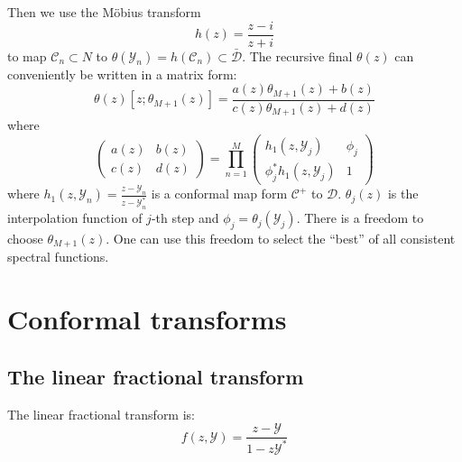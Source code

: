 \documentclass[
	preprint,%
	aps,
	prb,
	showpacs,	
	amsmath, amssymb]{revtex4-2}
\DeclareRobustCommand{\+}{\hstretch{1.25} {\boldsymbol {\mathrel{+}}}}
\newcommand{\Y}{ {\mathcal{Y}} }
\newcommand{\C}{ {\mathcal{C}} }
\newcommand{\D}{ {\mathcal{D}} }
\newcommand{\Dbar}{ {\bar{\mathcal{D}}} }
\begin{document}
Then we use the Möbius transform
\begin{equation}\label{eq:Mobius-transform}
	h(z) = \frac{z - i}{z + i}
\end{equation}
to map $\C_n \subset N$ to 
$\theta(\Y_n) = h(\C_n) \subset \Dbar$. 
The recursive final $\theta(z)$ can conveniently be written in a
matrix form:
\begin{equation}\label{eq:recursive-theta}
	\theta(z)[z;\theta_{M+1}(z)] 
		= \frac{a(z)\theta_{M+1}(z) + b(z)}{c(z)\theta_{M+1}(z) + d(z)}
\end{equation}
where
\begin{equation}\label{eq:factor-matrix}
	\left(
		\begin{matrix}
			a(z) & b(z) \\
			c(z) & d(z)
		\end{matrix}
	\right) = \prod_{n=1}^M
	\left(
		\begin{matrix}
			h_1(z, \Y_j) & \phi_j \\
			\phi_j^* h_1(z, \Y_j) & 1
		\end{matrix}
	\right)
\end{equation}
where $h_1(z, \Y_n) = \frac{z - \Y_n}{z -\Y_n^*}$ 
is a conformal map form $\C^+$ to $\D$. $\theta_j(z)$ is 
the interpolation function of $j$-th step and
$\phi_j = \theta_j(\Y_j)$. There is a freedom to choose $\theta_{M+1}(z)$.
One can use this freedom to select the “best” of all consistent spectral functions.




\appendix
\section{Conformal transforms}
\label{app:conformal-transforms}

\subsection{The linear fractional transform}
\label{appsub:linear-fractional-transform}
The linear fractional transform is:
\begin{equation}\label{eq:linear-fractional-transform}
	f(z, \Y) = \frac{z - \Y}{1 - z\Y^*}
\end{equation}
\end{document}
